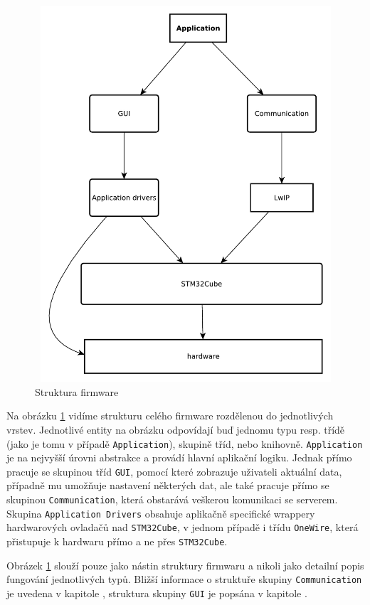 \begin{figure}[tbh]\centering
\includegraphics[width=140mm, height=140mm]{../diagrams/stm_fw_struktura.pdf}
\caption{Struktura firmware}
\label{stm-fw-struktura}
\end{figure}

Na obrázku \ref{stm-fw-struktura} vidíme strukturu celého firmware rozdělenou do jednotlivých vrstev.
Jednotlivé entity na obrázku odpovídají buď jednomu typu resp. třídě (jako je tomu v případě \texttt{Application}),
skupině tříd, nebo knihovně.
\texttt{Application} je na nejvyšší úrovni abstrakce a provádí hlavní aplikační logiku.
Jednak přímo pracuje se skupinou tříd \texttt{GUI}, pomocí které zobrazuje uživateli aktuální data,
případně mu umožňuje nastavení některých dat, ale také pracuje přímo se skupinou \texttt{Communication},
která obstarává veškerou komunikaci se serverem.
Skupina \texttt{Application Drivers} obsahuje aplikačně specifické wrappery hardwarových ovladačů nad
\texttt{STM32Cube}, v jednom případě i třídu \texttt{OneWire}, která přistupuje k hardwaru přímo
a ne přes \texttt{STM32Cube}.

Obrázek \ref{stm-fw-struktura} slouží pouze jako nástin struktury firmwaru a nikoli jako detailní popis
fungování jednotlivých typů.
Bližší informace o struktuře skupiny \texttt{Communication} je uvedena v kapitole ,
struktura skupiny \texttt{GUI} je popsána v kapitole .


